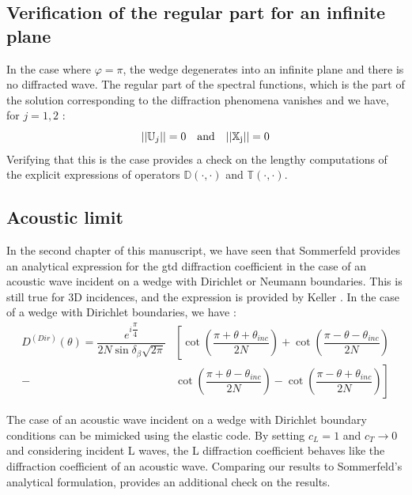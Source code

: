 \subsection{Verification of the regular part for an infinite plane}
In the case where $\varphi=\pi$, the wedge degenerates into an infinite plane and there is no diffracted wave. The regular part of the spectral functions, which is the part of the solution corresponding to the diffraction phenomena vanishes and we have, for $j=1,2$ :
\begin{equation}
||\mathbb{U}_j||=0 \hspace{1em} \rm and \hspace{1em} ||\mathbb{X}_j||=0
\end{equation}
Verifying that this is the case provides a check on the lengthy computations of the explicit expressions of operators $\mathbb{D}(\cdot,\cdot)$ and $\mathbb{T}(\cdot,\cdot)$.

\subsection{Acoustic limit}
In the second chapter of this manuscript, we have seen that Sommerfeld \cite{Sommerfeld} provides an analytical expression for the \acrshort{gtd} diffraction coefficient in the case of an acoustic wave incident on a wedge with Dirichlet or Neumann boundaries. This is still true for 3D incidences, and the expression is provided by Keller \cite{GTD}. In the case of a wedge with Dirichlet boundaries, we have :
\begin{equation}
\begin{split}
D^{(Dir)}(\theta)=\dfrac{e^{i\dfrac{\pi}{4}}}{2N\sin\delta_{\beta}\sqrt{2\pi}} &\left[ \cot\left(\dfrac{\pi+\theta+\theta_{inc}}{2N} \right) +\cot\left(\dfrac{\pi-\theta-\theta_{inc}}{2N} \right) \right.\\
-&\left. \cot\left(\dfrac{\pi+\theta-\theta_{inc}}{2N} \right)-\cot\left(\dfrac{\pi-\theta+\theta_{inc}}{2N} \right)\right]
\end{split}
\end{equation}

The case of an acoustic wave incident on a wedge with Dirichlet boundary conditions can be mimicked using the elastic code. By setting $c_L=1$ and $c_T \rightarrow 0$ and considering incident L waves, the L diffraction coefficient behaves like the diffraction coefficient of an acoustic wave. Comparing our results to Sommerfeld's analytical formulation, provides an additional check on the results.

